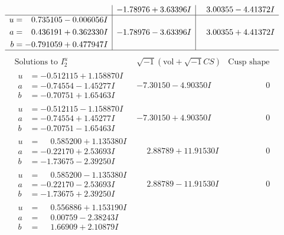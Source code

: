 \documentclass[1p]{elsarticle_modified}
\theoremstyle{definition}
\newcommand{\I}{\sqrt{-1}}
\begin{document}
$$\begin{array}{c|c|c}
 & -1.78976 + 3.63396 I & \phantom{-}3.00355 - 4.41372 I \\ \hline\begin{aligned}
u &= \phantom{-}0.735105 - 0.006056 I \\
a &= \phantom{-}0.436191 + 0.362330 I \\
b &= -0.791059 + 0.477947 I\end{aligned}
 & -1.78976 - 3.63396 I & \phantom{-}3.00355 + 4.41372 I\\
 \hline 
 \end{array}$$\newpage$$\begin{array}{c|c|c}  
\text{Solutions to }I^u_{2}& \I (\text{vol} + \sqrt{-1}CS) & \text{Cusp shape}\\
 \hline 
\begin{aligned}
u &= -0.512115 + 1.158870 I \\
a &= -0.74554 - 1.45277 I \\
b &= -0.70751 + 1.65463 I\end{aligned}
 & -7.30150 - 4.90350 I & \phantom{-0.000000 } 0 \\ \hline\begin{aligned}
u &= -0.512115 - 1.158870 I \\
a &= -0.74554 + 1.45277 I \\
b &= -0.70751 - 1.65463 I\end{aligned}
 & -7.30150 + 4.90350 I & \phantom{-0.000000 } 0 \\ \hline\begin{aligned}
u &= \phantom{-}0.585200 + 1.135380 I \\
a &= -0.22170 + 2.53693 I \\
b &= -1.73675 - 2.39250 I\end{aligned}
 & \phantom{-}2.88789 + 11.91530 I & \phantom{-0.000000 } 0 \\ \hline\begin{aligned}
u &= \phantom{-}0.585200 - 1.135380 I \\
a &= -0.22170 - 2.53693 I \\
b &= -1.73675 + 2.39250 I\end{aligned}
 & \phantom{-}2.88789 - 11.91530 I & \phantom{-0.000000 } 0 \\ \hline\begin{aligned}
u &= \phantom{-}0.556886 + 1.153190 I \\
a &= \phantom{-}0.00759 - 2.38243 I \\
b &= \phantom{-}1.66909 + 2.10879 I\end{aligned}

\end{array}$$
\end{document}
